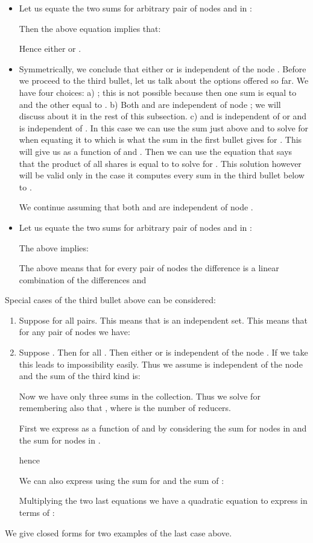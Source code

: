 \begin{itemize}
\item Let us equate the two sums for arbitrary pair of nodes  and  in :

Then the above equation implies that:

Hence either  or .
\item Symmetrically, we conclude that either  or 
is independent of the node .
Before we proceed to the third bullet, let us talk about the options offered so far.
We have four choices: a) ; this is not possible because then one sum is
equal to  and the other equal to . b) Both  and  are independent
of node ; we will discuss about it in the rest of this subsection. c)  and  is
independent of  or  and  is independent of . In this case we can use
the sum just above and to solve for  when equating it to  which is
what the sum in the first bullet gives for . This will give us  as a
function of  and . Then we can use the equation that says that the
product of all shares is equal to  to solve for . This solution however
will be valid only in the case it computes every sum in the third bullet
below to .

We continue assuming that both  and  are independent
of node .
\item Let us equate the two sums for arbitrary pair of nodes  and   in :

The above implies:

The above means that for every pair of nodes the difference  is a linear
combination of the differences  and 
\end{itemize}

Special cases of the third bullet above can be considered:
\begin{enumerate}
\item
Suppose  for all pairs. This means that  is an independent set.
This means that for any pair of nodes  we have:

\item Suppose . Then   for all .
Then either  or  is independent of the node .
If we take  this leads to impossibility easily.
Thus we assume  is independent of the node  and the sum of the third kind
is:

Now we have only three sums in the collection. Thus we solve for 
remembering also that , where  is the number of reducers.

First we express  as a function of  and 
by considering the sum for nodes in  and the sum for nodes in .

hence

We can also express  using the sum for  and the sum of :

Multiplying the two last equations we have a quadratic equation to express  in terms of :


\end{enumerate}
We give closed forms for two examples of the last case above.


